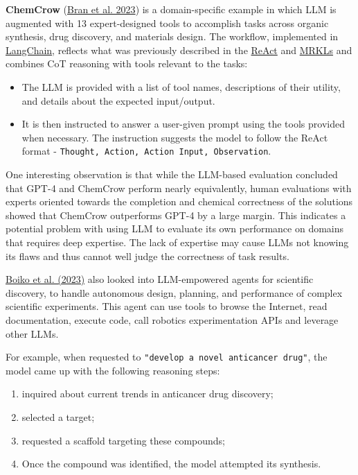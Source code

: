 \textbf{ChemCrow} (\href{https://arxiv.org/abs/2304.05376}{Bran et al. 2023}) is a domain-specific example in which LLM is augmented with 13 expert-designed tools to accomplish tasks across organic synthesis, drug discovery, and materials design. The workflow, implemented in \href{https://github.com/hwchase17/langchain}{LangChain}, reflects what was previously described in the \hyperref[react]{ReAct} and \hyperref[mrkl]{MRKLs} and combines CoT reasoning with tools relevant to the tasks:

\begin{itemize}
\tightlist
\item
  The LLM is provided with a list of tool names, descriptions of their utility, and details about the expected input/output.
\item
  It is then instructed to answer a user-given prompt using the tools provided when necessary. The instruction suggests the model to follow the ReAct format - \texttt{Thought,\ Action,\ Action\ Input,\ Observation}.
\end{itemize}

One interesting observation is that while the LLM-based evaluation concluded that GPT-4 and ChemCrow perform nearly equivalently, human evaluations with experts oriented towards the completion and chemical correctness of the solutions showed that ChemCrow outperforms GPT-4 by a large margin. This indicates a potential problem with using LLM to evaluate its own performance on domains that requires deep expertise. The lack of expertise may cause LLMs not knowing its flaws and thus cannot well judge the correctness of task results.

\href{https://arxiv.org/abs/2304.05332}{Boiko et al. (2023)} also looked into LLM-empowered agents for scientific discovery, to handle autonomous design, planning, and performance of complex scientific experiments. This agent can use tools to browse the Internet, read documentation, execute code, call robotics experimentation APIs and leverage other LLMs.

For example, when requested to \texttt{"develop\ a\ novel\ anticancer\ drug"}, the model came up with the following reasoning steps:

\begin{enumerate}
\tightlist
\item
  inquired about current trends in anticancer drug discovery;
\item
  selected a target;
\item
  requested a scaffold targeting these compounds;
\item
  Once the compound was identified, the model attempted its synthesis.
\end{enumerate}

